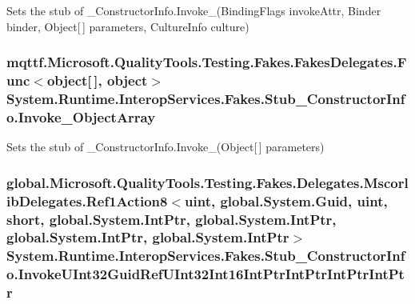 Sets the stub of \-\_\-\-Constructor\-Info.\-Invoke\-\_(\-Binding\-Flags invoke\-Attr, Binder binder, Object\mbox{[}$\,$\mbox{]} parameters, Culture\-Info culture)

\hypertarget{class_system_1_1_runtime_1_1_interop_services_1_1_fakes_1_1_stub___constructor_info_a2bd0c7b27cfdc35dc59cfc9face996d9}{
\subsubsection[{Invoke\-\_\-5\-Object\-Array}]{\setlength{\rightskip}{0pt plus 5cm}mqttf.\-Microsoft.\-Quality\-Tools.\-Testing.\-Fakes.\-Fakes\-Delegates.\-Func$<$object\mbox{[}$\,$\mbox{]}, object$>$ System.\-Runtime.\-Interop\-Services.\-Fakes.\-Stub\-\_\-\-Constructor\-Info.\-Invoke\-\_\-Object\-Array}}\label{class_system_1_1_runtime_1_1_interop_services_1_1_fakes_1_1_stub___constructor_info_a2bd0c7b27cfdc35dc59cfc9face996d9}


Sets the stub of \-\_\-\-Constructor\-Info.\-Invoke\-\_(\-Object\mbox{[}$\,$\mbox{]} parameters)

\hypertarget{class_system_1_1_runtime_1_1_interop_services_1_1_fakes_1_1_stub___constructor_info_af916e71f4143e6e6b5af2fbc806e72c1}{
\subsubsection[{Invoke\-U\-Int32\-Guid\-Ref\-U\-Int32\-Int16\-Int\-Ptr\-Int\-Ptr\-Int\-Ptr\-Int\-Ptr}]{\setlength{\rightskip}{0pt plus 5cm}global.\-Microsoft.\-Quality\-Tools.\-Testing.\-Fakes.\-Delegates.\-Mscorlib\-Delegates.\-Ref1\-Action8$<$uint, global.\-System.\-Guid, uint, short, global.\-System.\-Int\-Ptr, global.\-System.\-Int\-Ptr, global.\-System.\-Int\-Ptr, global.\-System.\-Int\-Ptr$>$ System.\-Runtime.\-Interop\-Services.\-Fakes.\-Stub\-\_\-\-Constructor\-Info.\-Invoke\-U\-Int32\-Guid\-Ref\-U\-Int32\-Int16\-Int\-Ptr\-Int\-Ptr\-Int\-Ptr\-Int\-Ptr}}\label{class_system_1_1_runtime_1_1_interop_services_1_1_fakes_1_1_stub___constructor_info_af916e71f4143e6e6b5af2fbc806e72c1}


